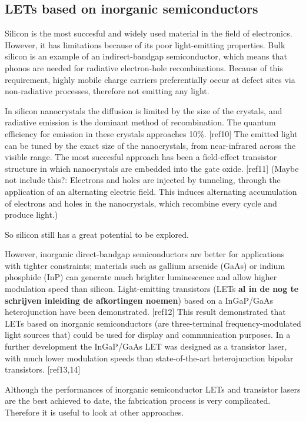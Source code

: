 \subsection{LETs based on inorganic semiconductors} %

Silicon is the most succesful and widely used material in the field of electronics. However, it has limitations because of its poor light-emitting properties. Bulk silicon is an example of an indirect-bandgap semiconductor, which means that phonos are needed for radiative electron-hole recombinations. Because of this requirement, highly mobile charge carriers preferentially occur at defect sites via non-radiative processes, therefore not emitting any light.

In silicon nanocrystals the diffusion is limited by the size of the crystals, and radiative emission is the dominant method of recombination. The quantum efficiency for emission in these crystals approaches 10\%. [ref10] The emitted light can be tuned by the exact size of the nanocrystals, from near-infrared across the visible range. The most succesful approach has been a field-effect transistor structure in which nanocrystals are embedded into the gate oxide. [ref11] (Maybe not include this?: Electrons and holes are injected by tunneling, through the application of an alternating electric field. This induces alternating accumulation of electrons and holes in the nanocrystals, which recombine every cycle and produce light.)

So silicon still has a great potential to be explored.

However, inorganic direct-bandgap semiconductors are better for applications with tighter constraints; materials such as gallium arsenide (GaAs) or indium phosphide (InP) can generate much brighter luminescence and allow higher modulation speed than silicon. Light-emitting transistors (LETs \textbf{al in de nog te schrijven inleiding de afkortingen noemen}) based on a InGaP/GaAs heterojunction have been demonstrated. [ref12] This result demonstrated that LETs based on inorganic semiconductors (are three-terminal frequency-modulated light sources that) could be used for display and communication purposes. In a further development the InGaP/GaAs LET was designed as a transistor laser, with much lower modulation speeds than state-of-the-art heterojunction bipolar transistors. [ref13,14]

Although the performances of inorganic semiconductor LETs and transistor lasers are the best achieved to date, the fabrication process is very complicated. Therefore it is useful to look at other approaches.